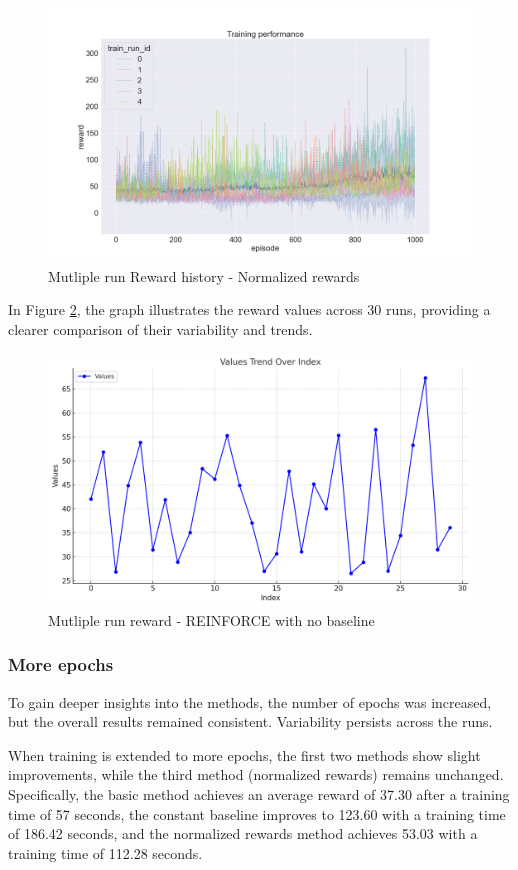 \documentclass{article}
\begin{document}
\begin{figure}[h]
	\centering
	\includegraphics[width=0.9\linewidth]{../data/plot/training_multiple_normalized.png}
	\caption{Mutliple run Reward history - Normalized rewards}
	\label{fig:plot12}
\end{figure}

In Figure \ref{fig:plot15}, the graph illustrates the reward values across 30 runs, providing a clearer comparison of their variability and trends.

\begin{figure}[h]
	\centering
	\includegraphics[width=0.6\linewidth]{../data/plot/trend_values_basic.png}
	\caption{Mutliple run reward - REINFORCE with no baseline}
	\label{fig:plot15}
\end{figure}

\subsubsection{More epochs}
To gain deeper insights into the methods, the number of epochs was increased, but the overall results remained consistent. Variability persists across the runs.

When training is extended to more epochs, the first two methods show slight improvements, while the third method (normalized rewards) remains unchanged. Specifically, the basic method achieves an average reward of 37.30 after a training time of 57 seconds, the constant baseline improves to 123.60 with a training time of 186.42 seconds, and the normalized rewards method achieves 53.03 with a training time of 112.28 seconds.
\end{document}
